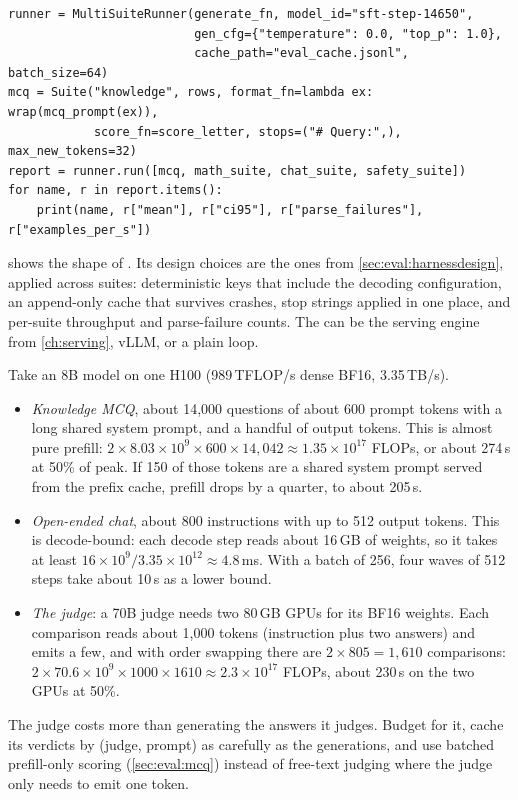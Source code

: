 \begin{lstlisting}[caption={Running several suites through one batched generator with a result cache.},label={lst:align:runner}]
runner = MultiSuiteRunner(generate_fn, model_id="sft-step-14650",
                          gen_cfg={"temperature": 0.0, "top_p": 1.0},
                          cache_path="eval_cache.jsonl", batch_size=64)
mcq = Suite("knowledge", rows, format_fn=lambda ex: wrap(mcq_prompt(ex)),
            score_fn=score_letter, stops=("# Query:",), max_new_tokens=32)
report = runner.run([mcq, math_suite, chat_suite, safety_suite])
for name, r in report.items():
    print(name, r["mean"], r["ci95"], r["parse_failures"], r["examples_per_s"])
\end{lstlisting}

 shows the shape of . Its
design choices are the ones from \cref{sec:eval:harnessdesign}, applied across suites:
deterministic keys that include the decoding configuration, an append-only cache that survives
crashes, stop strings applied in one place, and per-suite throughput and parse-failure counts.
The  can be the serving engine from \cref{ch:serving}, vLLM, or a plain loop.

\begin{napkinmath}
Take an 8B model on one H100 (989\,TFLOP/s dense BF16, 3.35\,TB/s).
\begin{itemize}
  \item \emph{Knowledge MCQ}, about 14{,}000 questions of about 600 prompt tokens with a long shared system prompt,
        and a handful of output tokens. This is almost pure prefill:
        $2\times8.03\times10^9\times600\times14{,}042\approx1.35\times10^{17}$ FLOPs, or about 274\,s at 50\% of peak.
        If 150 of those tokens are a shared system prompt served from the prefix cache, prefill
        drops by a quarter, to about 205\,s.
  \item \emph{Open-ended chat}, about 800 instructions with up to 512 output tokens. This is decode-bound: each
        decode step reads about 16\,GB of weights, so it takes at least $16\times10^9/3.35\times10^{12}\approx4.8$\,ms.
        With a batch of 256, four waves of 512 steps take about 10\,s as a lower bound.
  \item \emph{The judge}: a 70B judge needs two 80\,GB GPUs for its BF16 weights. Each comparison reads about
        1{,}000 tokens (instruction plus two answers) and emits a few, and with order swapping there are $2\times805=1{,}610$
        comparisons: $2\times70.6\times10^9\times1000\times1610\approx2.3\times10^{17}$ FLOPs,
        about 230\,s on the two GPUs at 50\%.
\end{itemize}
The judge costs more than generating the answers it judges. Budget for it, cache its verdicts
by (judge, prompt) as carefully as the generations, and use batched prefill-only scoring
(\cref{sec:eval:mcq}) instead of free-text judging where the judge only needs to emit one token.
\end{napkinmath}

